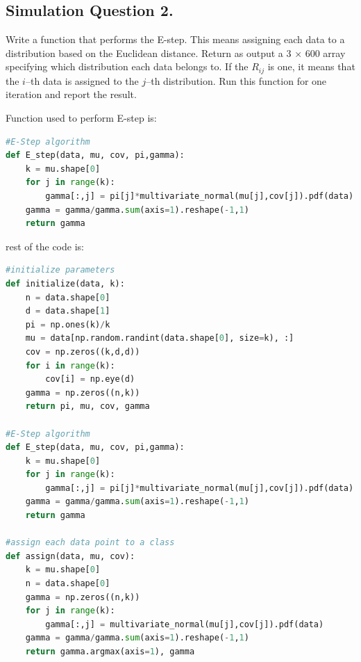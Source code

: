 \documentclass[12pt]{article}
\begin{document}
\subsection{Simulation Question 2.}
Write a function that performs the E-step. This means assigning each data to a distribution based on the Euclidean distance. Return as output a 3 × 600 array specifying which distribution each data belongs to. If the $R_{ij}$ is one, it means that the $i$–th data is assigned to the $j$–th distribution. Run this function for one iteration and report the result.
\begin{qsolve}
    Function used to perform E-step is:
    \begin{lstlisting}[language=Python,caption={E-step algorithm},label={code:E-step algorithm}]
#E-Step algorithm
def E_step(data, mu, cov, pi,gamma):
    k = mu.shape[0]
    for j in range(k):
        gamma[:,j] = pi[j]*multivariate_normal(mu[j],cov[j]).pdf(data)
    gamma = gamma/gamma.sum(axis=1).reshape(-1,1)
    return gamma
    \end{lstlisting}
    \splitqsolve
    rest of the code is:
    \begin{lstlisting}[language=Python,caption={Simulation Question 2.},label={code:Simulation Question 2.}]
#initialize parameters
def initialize(data, k):
    n = data.shape[0]
    d = data.shape[1]
    pi = np.ones(k)/k
    mu = data[np.random.randint(data.shape[0], size=k), :]
    cov = np.zeros((k,d,d))
    for i in range(k):
        cov[i] = np.eye(d)
    gamma = np.zeros((n,k))
    return pi, mu, cov, gamma

#E-Step algorithm
def E_step(data, mu, cov, pi,gamma):
    k = mu.shape[0]
    for j in range(k):
        gamma[:,j] = pi[j]*multivariate_normal(mu[j],cov[j]).pdf(data)
    gamma = gamma/gamma.sum(axis=1).reshape(-1,1)
    return gamma

#assign each data point to a class
def assign(data, mu, cov):
    k = mu.shape[0]
    n = data.shape[0]
    gamma = np.zeros((n,k))
    for j in range(k):
        gamma[:,j] = multivariate_normal(mu[j],cov[j]).pdf(data)
    gamma = gamma/gamma.sum(axis=1).reshape(-1,1)
    return gamma.argmax(axis=1), gamma


\end{lstlisting}
\end{qsolve}
\end{document}
